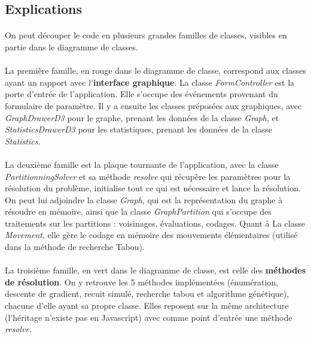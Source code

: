 \documentclass[12pt]{article}
\begin{document}
\subsection{Explications}

\paragraph{}On peut découper le code en plusieurs grandes familles de classes, visibles en partie dans le diagramme de classes.

\paragraph{}La première famille, en rouge dans le diagramme de classe, correspond aux classes ayant un rapport avec l'\textbf{interface graphique}. La classe \textit{FormController} est la porte d'entrée de l'application. Elle s'occupe des événements provenant du formulaire de paramètre. Il y a ensuite les classes préposées aux graphiques, avec \textit{GraphDrawerD3} pour le graphe, prenant les données de la classe \textit{Graph}, et \textit{StatisticsDrawerD3} pour les statistiques, prenant les données de la classe \textit{Statistics}.

\paragraph{}La deuxième famille est la plaque tournante de l'application, avec la classe \textit{PartitionningSolver} et sa méthode \textit{resolve} qui récupère les paramètres pour la résolution du problème, initialise tout ce qui est nécessaire et lance la résolution. On peut lui adjoindre la classe \textit{Graph}, qui est la représentation du graphe à résoudre en mémoire, ainsi que la classe \textit{GraphPartition} qui s'occupe des traitements sur les partitions : voisinages, évaluations, codages. Quant à La classe \textit{Movement}, elle gère le codage en mémoire des mouvements élémentaires (utilisé dans la méthode de recherche Tabou).

\paragraph{}La troisième famille, en vert dans le diagramme de classe, est celle des \textbf{méthodes de résolution}. On y retrouve les 5 méthodes implémentées (énumération, descente de gradient, recuit simulé, recherche tabou et algorithme génétique), chacune d'elle ayant sa propre classe. Elles reposent sur la même architecture (l'héritage n'existe pas en Javascript) avec comme point d'entrée une méthode \textit{resolve}.
\end{document}
